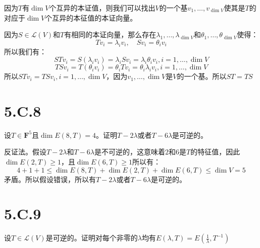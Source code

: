 \documentclass[10pt,a4paper,UTF8]{article}
\begin{document}
\begin{answer}
因为\(T\)有\(\dim V\)个互异的本证值，则我们可以找出\(V\)的一个基\(v_{1},\ldots ,v_{\dim V}\)使其是\(T\)的对应于\(\dim V\)个互异的本征值的本证向量。

因为\(S\in \mathcal{L}(V)\)和\(T\)有相同的本证向量，那么存在\(\lambda_{1},\ldots ,\lambda_{\dim V}\)和\(\theta_{1},\ldots ,\theta_{\dim V}\)使得：
\begin{equation}
\label{eq:8}
Tv_{i} = \lambda_{i}v_{i},\quad Sv_{i} = \theta_{i}v_{i}
\end{equation}
所以我们有：
\begin{equation}
\label{eq:9}
STv_{i} = S(\lambda_{i}v_{i}) = \lambda_{i}Sv_{i} = \lambda_{i}\theta_{i} v_{i},i=1,\ldots ,\dim V
\end{equation}
\begin{equation}
\label{eq:10}
TSv_{i} = T(\theta_{i}v_{i}) = \theta_{i}Tv_{i} = \theta_{i}\lambda_{i}v_{i} ,i = 1,\ldots ,\dim V
\end{equation}
所以\(STv_{i} = TSv_{i},i=1,\ldots ,\dim V\)，因为\(v_{1},\ldots ,\dim V\)是\(V\)的一个基。所以\(ST=TS\)
\end{answer}
\section{5.C.8}
\label{sec:org53d4aed}


\begin{problem}
设\(T\in \mathbf{F}^{5}\)且\(\dim E(8,T) = 4\)。证明\(T-2\lambda\)或者\(T-6\lambda\)是可逆的。
\end{problem}

\begin{answer}
反证法。假设\(T-2\lambda\)和\(T-6\lambda\)是不可逆的，这意味着\(2\)和\(6\)是\(T\)的特征值，因此\(\dim E(2,T)\geq 1\)，且\(\dim E(6,T)\geq 1\)所以有：
\begin{equation}
\label{eq:11}
4 + 1 + 1 \leq \dim E(8,T) + \dim E(2,T) + \dim E(6,T) \leq \dim V = 5
\end{equation}
矛盾。所以假设错误，所以有\(T-2\lambda\)或者\(T-6\lambda\)是可逆的。
\end{answer}
\section{5.C.9}
\label{sec:org379c3d8}


\begin{problem}
设\(T\in \mathcal{L}(V)\)是可逆的。证明对每个非零的\(\lambda\)均有\(E(\lambda,T) = E(\frac{1}{\lambda},T^{-1})\)
\end{problem}
\end{document}
